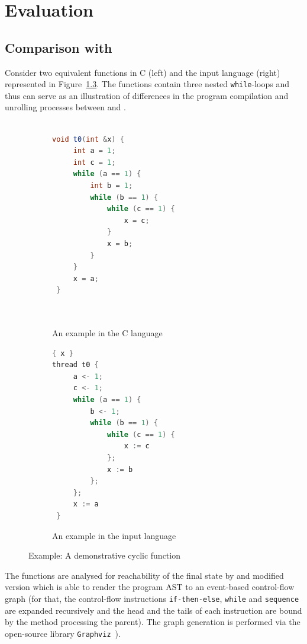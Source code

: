 \chapter{Evaluation}
\label{ch:eval}


\section{Comparison with \porthos[1]}
\label{ch:eval:show}

Consider two equivalent functions in C (left) and the \porthos[1] input language (right) represented in Figure~\ref{ex:test-both-cf}.
The functions contain three nested \texttt{while}-loops and thus can serve as an illustration of differences in the program compilation and unrolling processes between \porthos[1] and \porthos[2].

\begin{figure}[!h]
\begin{subfigure}[b]{.53\textwidth}\centering
\begin{lstlisting}[language=Java,basicstyle=\ttfamily\small]

void t0(int &x) {
     int a = 1;
     int c = 1;
     while (a == 1) {
         int b = 1;
         while (b == 1) {
             while (c == 1) {
                 x = c;
             }
             x = b;
         }
     }
     x = a;
 }
 
 
\end{lstlisting}
\caption{An example in the C language}
\label{ex:both-cf:ptsC}
\end{subfigure}
\begin{subfigure}[b]{.45\textwidth}\centering
\begin{lstlisting}[language=Java,basicstyle=\ttfamily\small]
{ x }
thread t0 {
     a <- 1;
     c <- 1;
     while (a == 1) {
         b <- 1;
         while (b == 1) {
             while (c == 1) {
                 x := c
             };
             x := b
         };
     };
     x := a
 }
\end{lstlisting}
\caption{An example in the \porthos[1] input language}
\label{ex:both-cf:pts1}
\end{subfigure}
\caption{Example: A demonstrative cyclic function}
\label{ex:test-both-cf}
\end{figure}

The functions are analysed for reachability of the final state by \porthos[2] and modified version \porthos[1] which is able to render the program AST to an event-based control-flow graph (for that, the control-flow instructions \texttt{if-then-else}, \texttt{while} and \texttt{sequence} are expanded recursively and the head and the tails of each instruction are bound by the method processing the parent).
The graph generation is performed via the open-source library \texttt{Graphviz}~\cite{ellson2001graphviz}).


